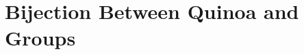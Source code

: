 \documentclass[../textbook.tex]{subfiles}
\begin{document}
\section{Bijection Between Quinoa and Groups}
\end{document}
